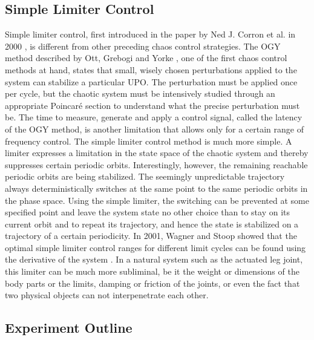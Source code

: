 \documentclass[main]{subfiles}
\begin{document}
\subsection{Simple Limiter Control}

Simple limiter control, first introduced in the paper by Ned J. Corron et al. in 2000 \cite{bib:Corron2000}, is different from other preceding chaos control strategies. %
%
The OGY method described by Ott, Grebogi and Yorke \cite{bib:Ott1990}, one of the first chaos control methods at hand, states that small, wisely chosen perturbations applied to the system can stabilize a particular UPO. %
%
The perturbation must be applied once per cycle, but the chaotic system must be intensively studied through an appropriate Poincaré section to understand what the precise perturbation must be. %
%
The time to measure, generate and apply a control signal, called the latency of the OGY method, is another limitation that allows only for a certain range of frequency control. %
%
The simple limiter control method is much more simple. A limiter expresses a limitation in the state space of the chaotic system and thereby suppresses certain periodic orbits. %
%
%
Interestingly, however, the remaining reachable periodic orbits are being stabilized. %
%
The seemingly unpredictable trajectory always deterministically switches at the same point to the same periodic orbits in the phase space. %
%
Using the simple limiter, the switching can be prevented at some specified point and leave the system state no other choice than to stay on its current orbit and to repeat its trajectory, and hence the state is stabilized on a trajectory of a certain periodicity. %
%
In 2001, Wagner and Stoop showed that the optimal simple limiter control ranges for different limit cycles can be found using the derivative of the system \cite{bib:Wagner2001}. %
%
In a natural system such as the actuated leg joint, this limiter can be much more subliminal, be it the weight or dimensions of the body parts or the limits, damping or friction of the joints, or even the fact that two physical objects can not interpenetrate each other. %
%

\subsection{Experiment Outline}
\end{document}
